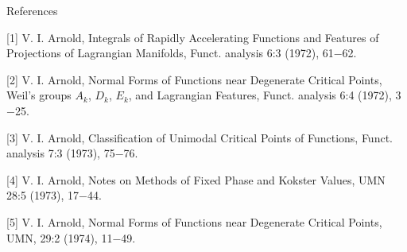 \documentclass{article}
\begin{document}
\begin{enumerate}
References

[1] V. I. Arnold, Integrals of Rapidly Accelerating Functions and Features of
Projections of Lagrangian Manifolds, Funct. analysis 6:3 (1972), 61$-$62.

[2] V. I. Arnold, Normal Forms of Functions near Degenerate Critical Points,
Weil's groups $A_k$, $D_k$, $E_k$, and Lagrangian Features, Funct. analysis 6:4
(1972), 3$-$25.

[3] V. I. Arnold, Classification of Unimodal Critical Points of Functions,
Funct. analysis 7:3 (1973), 75$-$76.

[4] V. I. Arnold, Notes on Methods of Fixed Phase and Kokster Values, UMN 28:5
(1973), 17$-$44.

[5] V. I. Arnold, Normal Forms of Functions near Degenerate Critical Points,
UMN, 29:2 (1974), 11$-$49.
\end{enumerate}
\end{document}
